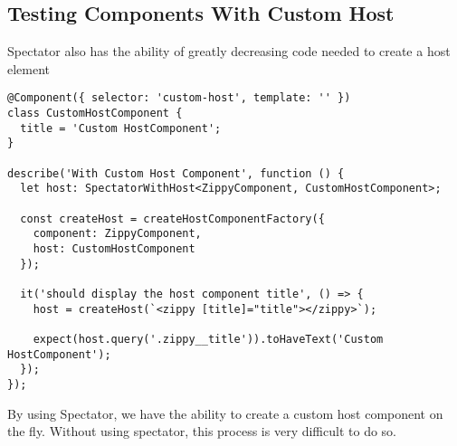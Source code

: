 \subsection{ Testing Components With Custom Host }
Spectator also has the ability of greatly decreasing code needed to create a
host element

\begin{lstlisting}
@Component({ selector: 'custom-host', template: '' })
class CustomHostComponent {
  title = 'Custom HostComponent';
}

describe('With Custom Host Component', function () {
  let host: SpectatorWithHost<ZippyComponent, CustomHostComponent>;

  const createHost = createHostComponentFactory({
    component: ZippyComponent,
    host: CustomHostComponent
  });

  it('should display the host component title', () => {
    host = createHost(`<zippy [title]="title"></zippy>`);

    expect(host.query('.zippy__title')).toHaveText('Custom HostComponent');
  });
});
\end{lstlisting}

By using Spectator, we have the ability to create a custom host component on
the fly. Without using spectator, this process is very difficult to do so. 
